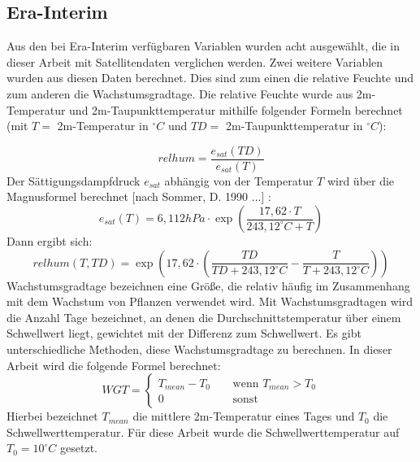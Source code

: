 \documentclass[]{article}
\begin{document}
\subsection{Era-Interim}
Aus den bei Era-Interim verfügbaren Variablen wurden acht ausgewählt, die in dieser Arbeit mit Satellitendaten verglichen werden. Zwei weitere Variablen wurden aus diesen Daten berechnet. Dies sind zum einen die relative Feuchte und zum anderen die Wachstumsgradtage. Die relative Feuchte wurde aus 2m-Temperatur und 2m-Taupunkttemperatur mithilfe folgender Formeln berechnet (mit $T=$ 2m-Temperatur in $^{\circ} C$ und $TD=$ 2m-Taupunkttemperatur in $^{\circ}C$):

\begin{equation}
relhum=\frac{e_{sat}(TD)}{e_{sat}(T)}
\end{equation}
Der Sättigungsdampfdruck $e_{sat}$ abhängig von der Temperatur $T$ wird über die Magnusformel berechnet [nach Sommer, D. 1990 ...] :
\begin{equation}
e_{sat}(T)=6,112hPa\cdot\exp\left(\frac{17,62 \cdot T}{243,12 ^{\circ}C + T}\right)
\end{equation}
Dann ergibt sich:
\begin{equation}
relhum(T,TD)=\exp\left(17,62\cdot\left(\frac{TD}{TD+243,12^{\circ}C}-\frac{T}{T+243,12^{\circ}C}\right)\right)
\end{equation}
Wachstumsgradtage bezeichnen eine Größe, die relativ häufig im Zusammenhang mit dem Wachstum von Pflanzen verwendet wird. Mit Wachstumsgradtagen wird die Anzahl Tage bezeichnet, an denen die Durchschnittstemperatur über einem
Schwellwert liegt, gewichtet mit der Differenz zum Schwellwert. Es gibt unterschiedliche Methoden, diese Wachstumsgradtage zu berechnen. In dieser Arbeit wird die folgende Formel berechnet:
\begin{equation}
WGT=\begin{cases}
T_{mean}-T_0 & \;\;\;\text{ wenn }  T_{mean}>T_0 \\
0 & \; \;\;\text{ sonst} 
\end{cases}
\end{equation}
Hierbei bezeichnet $T_{mean}$ die mittlere 2m-Temperatur eines Tages und $T_0$ die Schwellwerttemperatur. Für diese Arbeit wurde die Schwellwerttemperatur auf $T_0=10^\circ C$ gesetzt. \\
\end{document}
